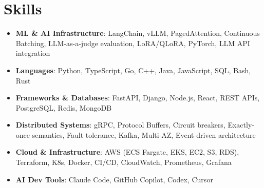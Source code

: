 \documentclass[letterpaper,11pt]{article}
\newcommand{\resumeSubHeadingListStart}{\begin{itemize}[leftmargin=0.15in, label={}]}
\newcommand{\resumeSubHeadingListEnd}{\end{itemize}}
\newcommand{\resumeSkillHeading}[2]{%
  \item\small{\textbf{#1}: #2 \vspace{-9pt}}%
}
\begin{document}
\section{Skills}
  \resumeSubHeadingListStart
    \resumeSkillHeading{ML \& AI Infrastructure}{LangChain, vLLM, PagedAttention, Continuous Batching, LLM-as-a-judge evaluation, LoRA/QLoRA, PyTorch, LLM API integration}
    \resumeSkillHeading{Languages}{Python, TypeScript, Go, C++, Java, JavaScript, SQL, Bash, Rust}
    \resumeSkillHeading{Frameworks \& Databases}{FastAPI, Django, Node.js, React, REST APIs, PostgreSQL, Redis, MongoDB}
    \resumeSkillHeading{Distributed Systems}{gRPC, Protocol Buffers, Circuit breakers, Exactly-once semantics, Fault tolerance, Kafka, Multi-AZ, Event-driven architecture}
    \resumeSkillHeading{Cloud \& Infrastructure}{AWS (ECS Fargate, EKS, EC2, S3, RDS), Terraform, K8s, Docker, CI/CD, CloudWatch, Prometheus, Grafana}
    \resumeSkillHeading{AI Dev Tools}{Claude Code, GitHub Copilot, Codex, Cursor}
  \resumeSubHeadingListEnd
\end{document}
